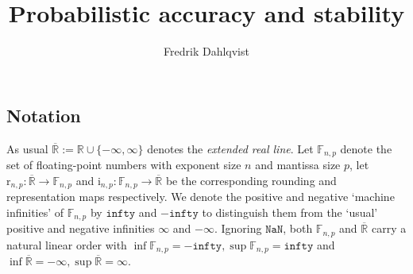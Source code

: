 \documentclass[10pt,a4paper]{article}
\author{Fredrik Dahlqvist}
\title{Probabilistic accuracy and stability}
\theoremstyle{plain}
\theoremstyle{definition}
\newcommand{\F}[1][n,p]{\mathbb{F}_{#1}}
\newcommand{\R}{\mathbb{R}}
\newcommand{\eR}{\overline{\R}}
\newcommand{\Rep}[1][n,p]{\mathrm{i}_{#1}}
\newcommand{\Round}[1][n,p]{\mathrm{r}_{#1}}
\newcommand{\NaN}{\mathtt{NaN}}
\newcommand{\minfty}{\mathtt{infty}}
\begin{document}
\maketitle

\subsection*{Notation}
As usual $\eR:=\R\cup\{-\infty,\infty\}$ denotes the \emph{extended real line}. 
Let $\F$ denote the set of floating-point numbers with exponent size $n$ and mantissa size $p$, let $\Round:\eR\to\F$ and $\Rep: \F\to \eR$ be the corresponding rounding and representation maps respectively. We denote the positive and negative `machine infinities' of $\F$ by $\minfty$ and $-\minfty$ to distinguish them from the `usual' positive and negative infinities $\infty$ and $-\infty$. Ignoring $\NaN$, both $\F$ and $\eR$ carry a natural linear order with $\inf \F=-\minfty,\sup\F=\minfty$ and $\inf \eR=-\infty,\sup\eR=\infty$.
\end{document}
